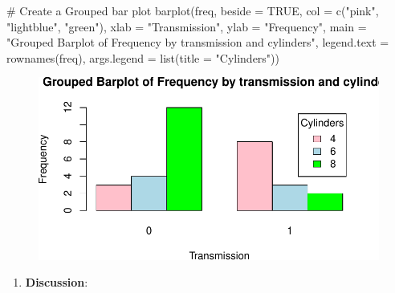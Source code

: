 \documentclass[
  letterpaper,
  DIV=11,
  numbers=noendperiod]{scrreport}
\newenvironment{Shaded}{\begin{snugshade}}{\end{snugshade}}
\newcommand{\AttributeTok}[1]{\textcolor[rgb]{0.40,0.45,0.13}{#1}}
\newcommand{\CommentTok}[1]{\textcolor[rgb]{0.37,0.37,0.37}{#1}}
\newcommand{\ConstantTok}[1]{\textcolor[rgb]{0.56,0.35,0.01}{#1}}
\newcommand{\FunctionTok}[1]{\textcolor[rgb]{0.28,0.35,0.67}{#1}}
\newcommand{\NormalTok}[1]{\textcolor[rgb]{0.00,0.23,0.31}{#1}}
\newcommand{\StringTok}[1]{\textcolor[rgb]{0.13,0.47,0.30}{#1}}
\providecommand{\tightlist}{%
  \setlength{\itemsep}{0pt}\setlength{\parskip}{0pt}}\usepackage{longtable,booktabs,array}
\begin{document}
\begin{Shaded}
\begin{Highlighting}[]
\CommentTok{\# Create a Grouped bar plot}
\FunctionTok{barplot}\NormalTok{(freq, }
        \AttributeTok{beside =} \ConstantTok{TRUE}\NormalTok{, }
        \AttributeTok{col =} \FunctionTok{c}\NormalTok{(}\StringTok{"pink"}\NormalTok{, }\StringTok{"lightblue"}\NormalTok{, }\StringTok{"green"}\NormalTok{), }
        \AttributeTok{xlab =} \StringTok{"Transmission"}\NormalTok{, }\AttributeTok{ylab =} \StringTok{"Frequency"}\NormalTok{, }
        \AttributeTok{main =} \StringTok{"Grouped Barplot of Frequency by transmission and cylinders"}\NormalTok{, }
        \AttributeTok{legend.text =} \FunctionTok{rownames}\NormalTok{(freq), }
        \AttributeTok{args.legend =} \FunctionTok{list}\NormalTok{(}\AttributeTok{title =} \StringTok{"Cylinders"}\NormalTok{))}
\end{Highlighting}
\end{Shaded}

\begin{figure}[H]

{\centering \includegraphics{08CategoricalData02_files/figure-pdf/unnamed-chunk-16-1.pdf}

}

\end{figure}

\begin{enumerate}
\def\labelenumi{\arabic{enumi}.}
\setcounter{enumi}{4}
\tightlist
\item
  \textbf{Discussion}:
\end{enumerate}
\end{document}
